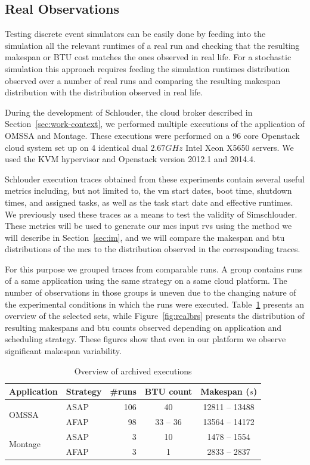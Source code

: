 \documentclass[10pt,conference,compsocconf]{IEEEtran}
\begin{document}
\subsection{Real Observations}

Testing  discrete event  simulators  can  be easily  done  by  feeding into  the
simulation  all the  relevant  runtimes of  a  real run  and  checking that  the
resulting makespan  or BTU cost  matches the ones observed  in real life.  For a
stochastic  simulation this  approach requires  feeding the  simulation runtimes
distribution observed  over a number  of real  runs and comparing  the resulting
makespan distribution with the distribution observed in real life.

During the development of Schlouder, the cloud broker described in
Section~\ref{sec:work-context}, we performed multiple executions of the
application of OMSSA and Montage. These executions were performed on a 96 core
Openstack cloud system set up on 4 identical dual $2.67GHz$ Intel Xeon X5650
servers. We used the KVM hypervisor and Openstack version 2012.1 and 2014.4.

Schlouder  execution  traces obtained  from  these  experiments contain  several
useful metrics  including, but  not limited  to, the  \ac{vm} start  dates, boot
time, shutdown  times, and assigned  tasks, as well as  the task start  date and
effective  runtimes. We  previously used  these traces  as a  means to  test the
validity of Simschlouder.   These metrics will be used to  generate our \ac{mcs}
input \acp{rv} using the method we will describe in Section~\ref{sec:im}, and we
will compare  the makespan  and \ac{btu}  distributions of  the \ac{mcs}  to the
distribution observed in the corresponding traces.

For this purpose we grouped traces  from comparable runs.  A group contains runs
of a  same application  using the same  strategy on a  same cloud  platform. The
number of observations in  those groups is uneven due to  the changing nature of
the    experimental   conditions    in   which    the   runs    were   executed.
Table~\ref{tab:nbruns}  presents  an  overview   of  the  selected  sets,  while
Figure~\ref{fig:realbrs} presents the distribution of resulting makespans and
\ac{btu} counts observed depending on application and scheduling strategy. These
figures show that even in our platform we observe significant makespan
variability.

\begin{table} \centering \caption{Overview of archived
	executions}\label{tab:nbruns} 
	\begin{tabular}{llrcc} \toprule
		Application&Strategy&\#runs&BTU count&Makespan ($s$)\\
		\midrule 
		\multirow{2}{*}{OMSSA}&ASAP&106&40&12811 -- 13488\\
				      &AFAP&98&33 -- 36&13564 -- 14172\\ 
		\midrule 
		\multirow{2}{*}{Montage}&ASAP&3&10&1478 -- 1554\\
				        &AFAP&3&1&2833 -- 2837\\
		\bottomrule 
	\end{tabular} 
\end{table}
\end{document}
